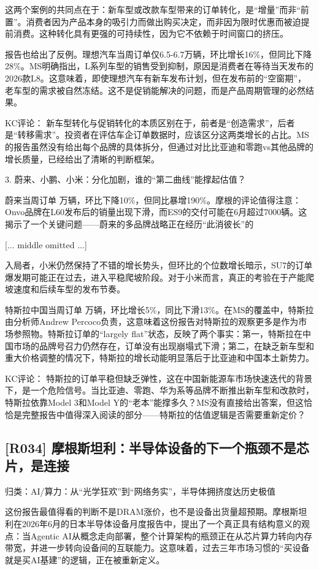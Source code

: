 \documentclass[11pt]{ctexart}
\begin{document}
这两个案例的共同点在于：新车型或改款车型带来的订单转化，是“增量”而非“前置”。消费者因为产品本身的吸引力而做出购买决定，而非因为限时优惠而被迫提前消费。这种转化具有更强的可持续性，因为它不依赖于时间窗口的挤压。

报告也给出了反例。理想汽车当周订单仅6.5-6.7万辆，环比增长16\%，但同比下降28\%。MS明确指出，L系列车型的销售受到抑制，原因是消费者在等待当天发布的2026款L8。这意味着，即使理想汽车有新车发布计划，但在发布前的“空窗期”，老车型的需求被自然冻结。这不是促销能解决的问题，而是产品周期管理的必然结果。

KC评论： 新车型转化与促销转化的本质区别在于，前者是“创造需求”，后者是“转移需求”。投资者在评估车企订单数据时，应该区分这两类增长的占比。MS的报告虽然没有给出每个品牌的具体拆分，但通过对比比亚迪和零跑vs其他品牌的增长质量，已经给出了清晰的判断框架。

3. 蔚来、小鹏、小米：分化加剧，谁的“第二曲线”能撑起估值？

蔚来当周订单 万辆，环比下降10\%，但同比暴增190\%。摩根的评论值得注意：Onvo品牌在L60发布后的销量出现下滑，而ES9的交付可能在6月超过7000辆。这揭示了一个关键问题——蔚来的多品牌战略正在经历“此消彼长”的

[... middle omitted ...]

入局者，小米仍然保持了不错的增长势头，但环比的个位数增长暗示，SU7的订单爆发期可能正在过去，进入平稳爬坡阶段。对于小米而言，真正的考验在于产能爬坡速度和后续车型的发布节奏。

特斯拉中国当周订单 万辆，环比增长5\%，同比下滑13\%。在MS的覆盖中，特斯拉由分析师Andrew Percoco负责，这意味着这份报告对特斯拉的观察更多是作为市场参照物。特斯拉订单的“largely flat”状态，反映了两个事实：第一，特斯拉在中国市场的品牌号召力仍然存在，订单没有出现崩塌式下滑；第二，在缺乏新车型和重大价格调整的情况下，特斯拉的增长动能明显落后于比亚迪和中国本土新势力。

KC评论： 特斯拉的订单平稳但缺乏弹性，这在中国新能源车市场快速迭代的背景下，是一个危险信号。当比亚迪、零跑、华为系等品牌不断推出新车型和改款时，特斯拉依靠Model 3和Model Y的“老本”能撑多久？MS没有直接给出答案，但这恰恰是完整报告中值得深入阅读的部分——特斯拉的估值逻辑是否需要重新定价？

\subsection{[R034] 摩根斯坦利：半导体设备的下一个瓶颈不是芯片，是连接}
{\small\color{refgray}归类：AI/算力：从“光学狂欢”到“网络务实”，半导体拥挤度达历史极值}

这份报告最值得看的判断不是DRAM涨价，也不是设备出货量超预期。摩根斯坦利在2026年6月的日本半导体设备月度报告中，提出了一个真正具有结构意义的观点：当Agentic AI从概念走向部署，整个计算架构的瓶颈正在从芯片算力转向内存带宽，并进一步转向设备间的互联能力。这意味着，过去三年市场习惯的“买设备就是买AI基建”的逻辑，正在被重新定义。
\end{document}

